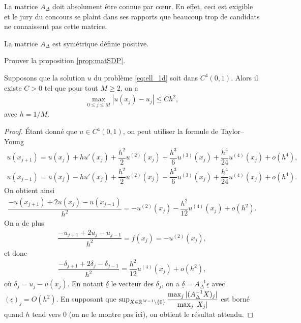 \documentclass[12pt,a4paper,twoside]{article}
\begin{document}
\begin{remark}
  La matrice $A_{\Delta}$ doit absolument \^etre connue par c\oe{}ur.
  En effet, ceci est exigible et le jury du concours se plaint dans ses rapports
  que beaucoup trop de candidats ne connaissent pas cette matrice.
\end{remark}

\begin{proposition}
  \label{prop:matSDP}
  La matrice $A_{\Delta}$ est sym\'etrique d\'efinie positive.
\end{proposition}


\begin{exercise}
  Prouver la proposition \ref{prop:matSDP}.
\end{exercise}

\begin{proposition}[Convergence]
  \label{prop:ell_conv}
  Supposons que la solution $u$ du probl\`eme \eqref{eq:ell_1d} soit 
  dans $C^4(0,1)$.
  Alors il existe $C>0$ tel que pour tout $M \geq 2$, on a
  \begin{align*}
    \max_{0 \leq j \leq M} | u(x_j) - u_j | \leq C h^2 ,
  \end{align*}
  avec $h = 1/M$.
\end{proposition}

\begin{proof}
  \'Etant donn\'e que $u \in C^{4}(0,1)$, on peut utiliser la formule de Taylor--Young
  \begin{align*}
    u(x_{j+1}) = u(x_j) + h u'(x_j) + \dfrac{h^2}{2} u^{(2)}(x_j) + \dfrac{h^3}{6} u^{(3)}(x_j)
    + \dfrac{h^4}{24} u^{(4)}(x_j) + o(h^4) ,
    \\
    u(x_{j-1}) = u(x_j) - h u'(x_j) + \dfrac{h^2}{2} u^{(2)}(x_j) - \dfrac{h^3}{6} u^{(3)}(x_j)
    + \dfrac{h^4}{24} u^{(4)}(x_j) + o(h^4) .
  \end{align*}
  On obtient ainsi
  \begin{align*}
    \dfrac{-u(x_{j+1}) + 2 u(x_j) - u(x_{j-1})}{h^2} = - u^{(2)}(x_j) - \dfrac{h^2}{12} u^{(4)}(x_j)
    + o (h^2) .
  \end{align*}
  On a de plus 
  \begin{align*}
    \dfrac{- u_{j+1} + 2 u_j - u_{j-1}}{h^2} = f(x_j) = - u^{(2)}(x_j) ,
  \end{align*}
  et donc
  \begin{align*}
    \dfrac{-\delta_{j+1} + 2 \delta_j - \delta_{j-1}}{h^2} = \dfrac{h^2}{12} u^{(4)}(x_j) + o(h^2) ,
  \end{align*}
  o\`u $\delta_j = u_j - u(x_j)$.
  En notant $\underline{\delta}$ le vecteur des $\delta_j$,
  on a $\underline{\delta} = A_{\Delta}^{-1} \underline{\epsilon}$
  avec $(\underline{\epsilon})_j = O(h^2)$.
  En supposant que $\sup_{X \in \mathbb{R}^{M-1}\backslash \{0\}} \dfrac{\max_{j} |(A_{\Delta}^{-1}X)_j|}{\max_j |X_j|}$
  est born\'e quand $h$ tend vers $0$ (on ne le montre pas ici), on obtient le r\'esultat attendu.
\end{proof}
\end{document}
